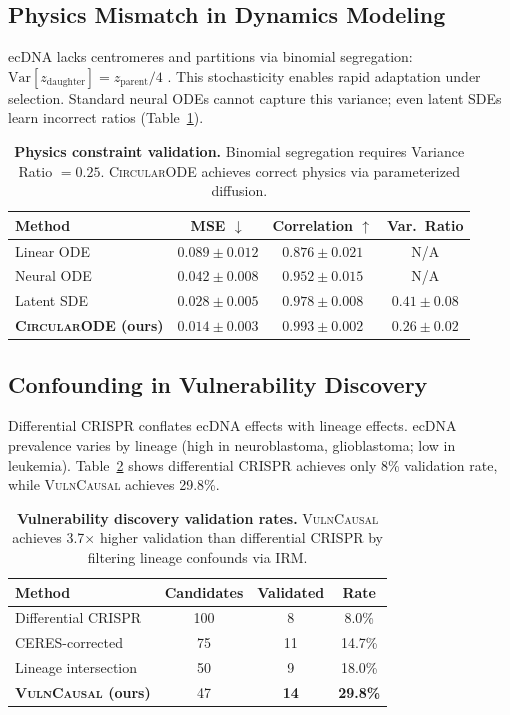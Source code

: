 \documentclass[runningheads]{llncs}
\newcommand{\circularode}{\textsc{CircularODE}}
\newcommand{\vulncausal}{\textsc{VulnCausal}}
\begin{document}
\subsection{Physics Mismatch in Dynamics Modeling}

ecDNA lacks centromeres and partitions via binomial segregation: $\text{Var}[z_{\text{daughter}}] = z_{\text{parent}}/4$ \cite{lange_2022_mathematical}. This stochasticity enables rapid adaptation under selection. Standard neural ODEs cannot capture this variance; even latent SDEs learn incorrect ratios (Table~\ref{tab:physics}).

\begin{table}[t]
\caption{\textbf{Physics constraint validation.} Binomial segregation requires Variance Ratio $= 0.25$. \circularode{} achieves correct physics via parameterized diffusion.}
\label{tab:physics}
\centering
\footnotesize
\begin{tabular}{@{}lccc@{}}
\toprule
Method & MSE $\downarrow$ & Correlation $\uparrow$ & Var.\ Ratio \\
\midrule
Linear ODE & $0.089 \pm 0.012$ & $0.876 \pm 0.021$ & N/A \\
Neural ODE & $0.042 \pm 0.008$ & $0.952 \pm 0.015$ & N/A \\
Latent SDE & $0.028 \pm 0.005$ & $0.978 \pm 0.008$ & $0.41 \pm 0.08$ \\
\textbf{\circularode{} (ours)} & $\mathbf{0.014 \pm 0.003}$ & $\mathbf{0.993 \pm 0.002}$ & $\mathbf{0.26 \pm 0.02}$ \\
\bottomrule
\end{tabular}
\end{table}

\subsection{Confounding in Vulnerability Discovery}

Differential CRISPR conflates ecDNA effects with lineage effects. ecDNA prevalence varies by lineage (high in neuroblastoma, glioblastoma; low in leukemia). Table~\ref{tab:confounding} shows differential CRISPR achieves only 8\% validation rate, while \vulncausal{} achieves 29.8\%.

\begin{table}[t]
\caption{\textbf{Vulnerability discovery validation rates.} \vulncausal{} achieves 3.7$\times$ higher validation than differential CRISPR by filtering lineage confounds via IRM.}
\label{tab:confounding}
\centering
\footnotesize
\begin{tabular}{@{}lccc@{}}
\toprule
Method & Candidates & Validated & Rate \\
\midrule
Differential CRISPR & 100 & 8 & 8.0\% \\
CERES-corrected & 75 & 11 & 14.7\% \\
Lineage intersection & 50 & 9 & 18.0\% \\
\textbf{\vulncausal{} (ours)} & 47 & \textbf{14} & \textbf{29.8\%} \\
\bottomrule
\end{tabular}
\end{table}
\end{document}
